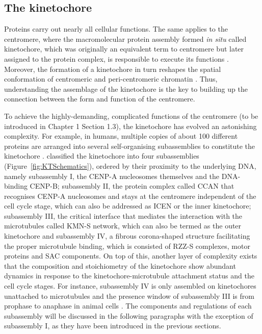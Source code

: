 
\subsection{The kinetochore}

Proteins carry out nearly all cellular functions. The same applies to the centromere, where the macromolecular protein assembly formed \textit{in situ} called kinetochore, which was originally an equivalent term to centromere \citep{Sharp1921IntroductionCytology, Darlington1936TheEnquiry} but later assigned to the protein complex, is responsible to execute its functions \citep{McAinsh2022TheKinetochores, McKinley2015TheFunction, Musacchio2017AFunction}. Moreover, the formation of a kinetochore in turn reshapes the spatial conformation of centromeric and peri-centromeric chromatin \citep{McAinsh2022TheKinetochores}. Thus, understanding the assemblage of the kinetochore is the key to building up the connection between the form and function of the centromere.

To achieve the highly-demanding, complicated functions of the centromere (to be introduced in Chapter 1 Section 1.3), the kinetochore has evolved an astonishing complexity. For example, in humans, multiple copies of about 100 different proteins are arranged into several self-organising subassemblies to constitute the kinetochore \citep{Cheeseman2014TheKinetochore}. \cite{McAinsh2022TheKinetochores} classified the kinetochore into four subassemblies (Figure~\ref{fig:KTSchematics}), ordered by their proximity to the underlying DNA, namely subassembly I, the CENP-A nucleosomes themselves and the DNA-binding CENP-B; subassembly II, the protein complex called CCAN that recognises CENP-A nucleosomes and stays at the centromere independent of the cell cycle stage, which can also be addressed as ICEN or the inner kinetochore; subassembly III, the critical interface that mediates the interaction with the microtubules called KMN-S network, which can also be termed as the outer kinetochore and subassembly IV, a fibrous corona-shaped structure facilitating the proper microtubule binding, which is consisted of RZZ-S complexes, motor proteins and SAC components. On top of this, another layer of complexity exists that the composition and stoichiometry of the kinetochore show abundant dynamics in response to the kinetochore-microtubule attachment status and the cell cycle stages. For instance, subassembly IV is only assembled on kinetochores unattached to microtubules and the presence window of subassembly III is from prophase to anaphase in animal cells \citep{Hara2020DynamicsProgression}. The components and regulations of each subassembly will be discussed in the following paragraphs with the exception of subassembly I, as they have been introduced in the previous sections. 

